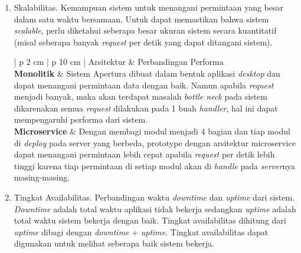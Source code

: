 \begin{enumerate}[leftmargin=*]
\begin{table}[H]
\begin{adjustbox}{width=1\textwidth}
\begin{tabular}{| p {2 cm} | p {10 cm} |}
				\hline
				\textbf{Microservice} & Dengan menggunakan arsitektur microservice, \textit{prototype} dapat menampilkan dan menerima data degan baik. Perancangan microservice yang membagi server menjadi lebih dari 1 memiliki keunggulan, yaitu tingkat keamanan data yang lebih tinggi. Misalnya dengan menyimpan data-data penting seperti data personal terpisah dari data umum, maka data personal akan tetap aman apabila database penyimpanan data umum mengalami kerusakan.\\
				\hline
			\end{tabular}
		\end{adjustbox}
	\end{table}
	\item Skalabilitas. Kemampuan sistem untuk menangani permintaan yang besar dalam satu waktu bersamaan. Untuk dapat memastikan bahwa sistem \textit{scalable}, perlu diketahui seberapa besar ukuran sistem secara kuantitatif (misal seberapa banyak \textit{request} per detik yang dapat ditangani sistem).
		\begin{table}[H]
		\small
		\begin{adjustbox}{width=1\textwidth}
			\begin{tabular}{| p {2 cm} | p {10 cm} |}
				\hline
				Arsitektur & Perbandingan Performa\\
				\hline
				\textbf{Monolitik} & Sistem Apertura dibuat dalam bentuk aplikasi \textit{desktop} dan dapat menangani permintaan data dengan baik. Namun apabila \textit{request} menjadi banyak, maka akan terdapat masalah \textit{bottle neck} pada sistem dikarenakan semua \textit{request} dilakukan pada 1 buah \textit{handler}, hal ini dapat mempengaruhi performa dari sistem.\\
				\hline
				\textbf{Microservice} & Dengan membagi modul menjadi 4 bagian dan tiap modul di \textit{deploy} pada server yang berbeda, prototype dengan arsitektur microservice dapat menangani permintaan lebih cepat apabila \textit{request} per detik lebih tinggi karena tiap permintaan di setiap modul akan di \textit{handle} pada \textit{server}nya masing-masing.\\
				\hline
			\end{tabular}
		\end{adjustbox}
	\end{table}
	\item Tingkat Availabilitas. Perbandingan waktu \textit{downtime} dan \textit{uptime} dari sistem. \textit{Downtime} adalah total waktu aplikasi tidak bekerja sedangkan \textit{uptime} adalah total waktu sistem bekerja dengan baik. Tingkat availabilitas dihitung dari \textit{uptime} dibagi dengan \textit{downtime} + \textit{uptime}. Tingkat availabilitas dapat digunakan untuk melihat seberapa baik sistem bekerja.

\end{enumerate}
